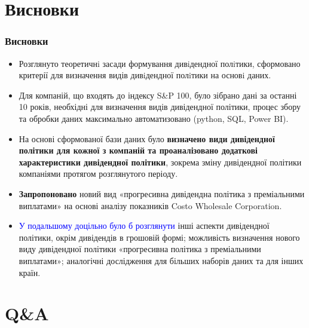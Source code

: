 \documentclass[aspectratio=169]{beamer}
\begin{document}
\section{Висновки}

\begin{frame}
\frametitle{Висновки}
\begin{itemize}
\item Розглянуто теоретичнi засади формування дивiдендної полiтики, сформовано критерії для визначення видів дивiдендної полiтики на основi даних. 
\item Для компаній, що
входять до індексу S\&P 100, було зібрано дані за останні 10
років, необхідні для визначення видів дивідендної політики, процес збору та обробки даних максимально автоматизовано (python, SQL, Power BI).
\smallskip
\item На основі сформованої бази даних було \alert {\textbf{визначено види дивідендної політики для кожної з компаній та проаналізовано додаткові характеристики дивідендної політики}}, зокрема зміну дивідендної політики компаніями протягом розглянутого періоду.
\smallskip
\item \alert {\textbf{Запропоновано}} новий вид \alert {«прогресивна дивідендна політика з преміальними виплатами»} на основі аналізу показників Costo Wholesale Corporation. 
\smallskip
{}
\item \textcolor{blue} {У подальшому доцільно було б розглянути} інші аспекти дивідендної політики, окрім дивідендів в грошовій формі; можливість визначення нового виду дивідендної політики «прогресивна політика з преміальними виплатами»; аналогічні дослідження для більших наборів даних та для інших країн.
\bigskip
\end{itemize}
\end{frame}

\section{Q\&A}
\end{document}
